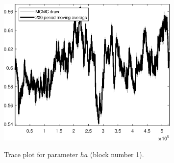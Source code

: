 \begin{figure}[H]
\centering
  \includegraphics[width=0.8\textwidth]{BRS_growth_KPR/graphs/TracePlot_ha_blck_1}\\
    \caption{Trace plot for parameter ${ha}$ (block number 1).}
\end{figure}
